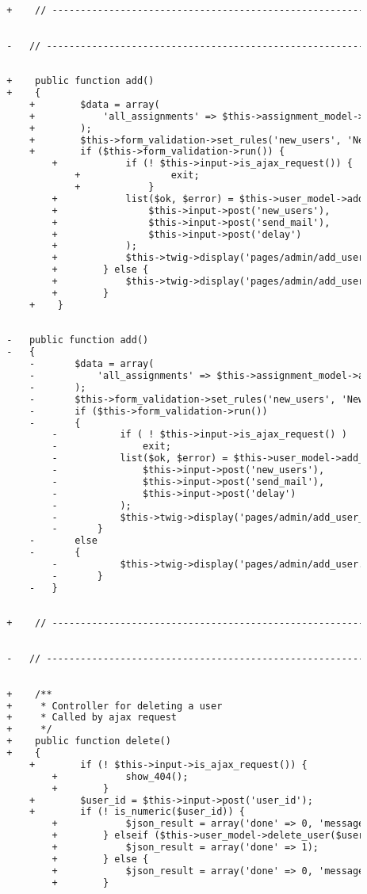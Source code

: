 \begin{lstlisting}[language=diff, caption=Perubahan pada kode Users.php]
		
		+    // ------------------------------------------------------------------------
		
		
		-	// ------------------------------------------------------------------------
		
		
		+    public function add()
		+    {
			+        $data = array(
			+            'all_assignments' => $this->assignment_model->all_assignments(),
			+        );
			+        $this->form_validation->set_rules('new_users', 'New Users', 'required');
			+        if ($this->form_validation->run()) {
				+            if (! $this->input->is_ajax_request()) {
					+                exit;
					+            }
				+            list($ok, $error) = $this->user_model->add_users(
				+                $this->input->post('new_users'),
				+                $this->input->post('send_mail'),
				+                $this->input->post('delay')
				+            );
				+            $this->twig->display('pages/admin/add_user_result.twig', array('ok' => $ok, 'error' => $error));
				+        } else {
				+            $this->twig->display('pages/admin/add_user.twig', $data);
				+        }
			+    }
		
		
		-	public function add()
		-	{
			-		$data = array(
			-			'all_assignments' => $this->assignment_model->all_assignments(),
			-		);
			-		$this->form_validation->set_rules('new_users', 'New Users', 'required');
			-		if ($this->form_validation->run())
			-		{
				-			if ( ! $this->input->is_ajax_request() )
				-				exit;
				-			list($ok, $error) = $this->user_model->add_users(
				-				$this->input->post('new_users'),
				-				$this->input->post('send_mail'),
				-				$this->input->post('delay')
				-			);
				-			$this->twig->display('pages/admin/add_user_result.twig', array('ok' => $ok, 'error' => $error));
				-		}
			-		else
			-		{
				-			$this->twig->display('pages/admin/add_user.twig', $data);
				-		}
			-	}
		
		
		+    // ------------------------------------------------------------------------
		
		
		-	// ------------------------------------------------------------------------
		
		
		+    /**
		+     * Controller for deleting a user
		+     * Called by ajax request
		+     */
		+    public function delete()
		+    {
			+        if (! $this->input->is_ajax_request()) {
				+            show_404();
				+        }
			+        $user_id = $this->input->post('user_id');
			+        if (! is_numeric($user_id)) {
				+            $json_result = array('done' => 0, 'message' => 'Input Error');
				+        } elseif ($this->user_model->delete_user($user_id)) {
				+            $json_result = array('done' => 1);
				+        } else {
				+            $json_result = array('done' => 0, 'message' => 'Deleting User Failed');
				+        }
			

\end{lstlisting}
